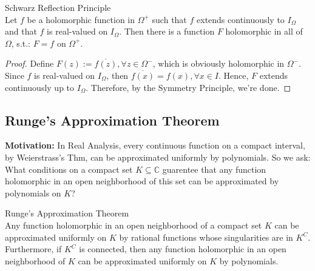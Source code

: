 \begin{theorem}{Schwarz Reflection Principle}\\
Let $f$ be a holomorphic function in $\Omega^+$ such that $f$ extends continuously to $I_\Omega$ and that $f$ is real-valued on $I_\Omega$. Then there is a function $F$ holomorphic in all of $\Omega$, s.t.: $F= f$ on $\Omega^+$.
\end{theorem}

\begin{proof}
    Define $F(z):= \overline{f(z)} ,\forall z\in \Omega^-$, which is obviously holomorphic in $\Omega^-$. Since $f$ is real-valued on $I_\Omega$, then $\overline{f(x)}=f(x), \forall x\in I$. Hence, $F$ extends continuously up to $I_\Omega$. Therefore, by the Symmetry Principle, we're done.
\end{proof}

\subsection{Runge's Approximation Theorem}

\noindent\textbf{Motivation:} In Real Analysis, every continuous function on a compact interval, by Weierstrass's Thm, can be approximated uniformly by polynomials. So we ask: What conditions on a compact set $K\subseteq \mathbb{C}$ guarentee that any function holomorphic in an open neighborhood of this set can be approximated by polynomials on $K$?

\begin{theorem}{Runge's Approximation Theorem}\\
Any function holomorphic in an open neighborhood of a compact set $K$ can be approximated uniformly on $K$ by rational functions whose singularities are in $K^C$. Furthermore, if $K^C$ is connected, then any function holomorphic in an open neighborhood of $K$ can be approximated uniformly on $K$ by polynomials.
\end{theorem}


